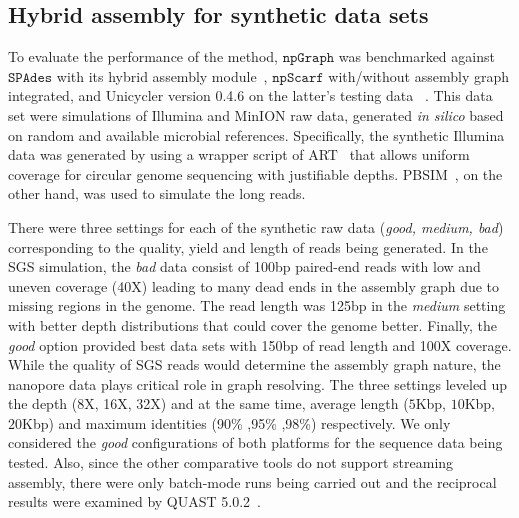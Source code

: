 \documentclass[10pt,twocolumn,twoside]{genpaper}
\newcommand{\npscarf}{$\mathtt{npScarf}$}
\newcommand{\npgraph}{$\mathtt{npGraph}$}
\newcommand{\spades}{$\mathtt{SPAdes}$}
\begin{document}
\subsection*{Hybrid assembly for synthetic data sets}
To evaluate the performance of the method, \npgraph{} was benchmarked against \spades{} with its hybrid assembly module~\cite{AntipovKM2015}, \npscarf{} with/without assembly graph integrated, and Unicycler version 0.4.6 on the latter's testing data~ \cite{Wick2017unicycler} . This data set were simulations of Illumina and MinION raw data, generated \emph{in silico} based on random and available microbial references. 
Specifically, the synthetic Illumina data was generated by using a wrapper script of ART~\cite{HuangLMM2012} that allows uniform coverage for circular genome sequencing with justifiable depths.
PBSIM~\cite{OnoAH2012}, on the other hand, was used to simulate the long reads.

There were three settings for each of the synthetic raw data (\emph{good, medium, bad}) corresponding to the quality, yield and length of reads being generated. 
In the SGS simulation, the \emph{bad} data consist of 100bp paired-end reads with low and uneven coverage (40X) leading to many dead ends in the assembly graph due to missing regions in the genome. 
The read length was 125bp in the \emph{medium} setting with better depth distributions that could cover the genome better. 
Finally, the \emph{good} option provided best data sets with 150bp of read length and 100X coverage.
While the quality of SGS reads would determine the assembly graph nature, the nanopore data plays critical role in graph resolving.
The three settings leveled up the depth (8X, 16X, 32X) and at the same time, average length ($5$Kbp, $10$Kbp, $20$Kbp) and maximum identities (90\% ,95\% ,98\%) respectively.
We only considered the \emph{good} configurations of both platforms for the sequence data being tested.
Also, since the other comparative tools do not support streaming assembly, there were only batch-mode runs being carried out and the reciprocal results were examined by QUAST 5.0.2~\cite{Mikheenko2018quast5}. 
\end{document}
